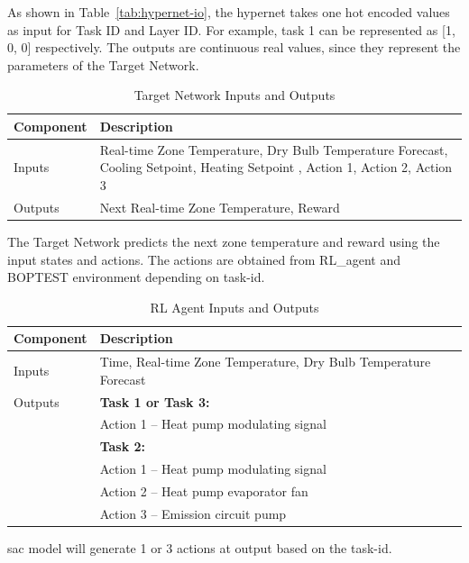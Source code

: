 \documentclass{article}
\begin{document}
As shown in Table~\ref{tab:hypernet-io}, the hypernet takes one hot encoded values as input for Task ID and Layer ID. For example, task 1 can be represented as [1, 0, 0]  respectively. The outputs are continuous real values, since they represent the parameters of the Target Network.

\vspace{-1em}

\begin{table}[H]
\centering
\caption{Target Network Inputs and Outputs}
\label{tab:targetnet-io}
\begin{tabular}{|l|p{10cm}|}
\hline
\textbf{Component} & \textbf{Description} \\
\hline
Inputs & Real-time Zone Temperature, Dry Bulb Temperature Forecast,  Cooling Setpoint, Heating Setpoint , Action 1, Action 2, Action 3\\
Outputs & Next Real-time Zone Temperature, Reward \\
\hline
\end{tabular}
\end{table}
The Target Network predicts the next zone temperature and reward using the input states and actions. The actions are obtained from RL\_agent and BOPTEST environment depending on task-id.

\vspace{-1em}

\begin{table}[H]
\centering
\caption{RL Agent Inputs and Outputs}
\label{tab:rl-agent-io}
\begin{tabular}{|l|p{12cm}|}
\hline
\textbf{Component} & \textbf{Description} \\
\hline
Inputs & Time, Real-time Zone Temperature, Dry Bulb Temperature Forecast \\
\hline
Outputs &
\textbf{Task 1 or Task 3:} \\
& \quad Action 1 – Heat pump modulating signal \\
& \textbf{Task 2:} \\
& \quad Action 1 – Heat pump modulating signal \\
& \quad Action 2 – Heat pump evaporator fan \\
& \quad Action 3 – Emission circuit pump \\
\hline
\end{tabular}
\end{table}

\gls{sac} model will generate 1 or 3 actions at output based on the task-id.
\end{document}
